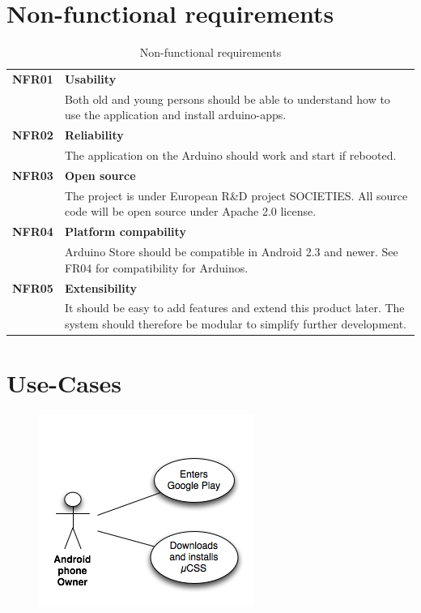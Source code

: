 \section{Non-functional requirements}
\begin{table}[H]
\begin{tabularx}{\linewidth}{lX}
\textbf{NFR01} & \textbf{Usability}\\
 & Both old and young persons should be able to understand how to use the application and install arduino-apps.\\
\textbf{NFR02} & \textbf{Reliability}\\
 & The application on the Arduino should work and start if rebooted.\\
\textbf{NFR03} & \textbf{Open source}\\
 & The project is under European R\&D project SOCIETIES. All source code will be open source under Apache 2.0 license.\\
\textbf{NFR04} & \textbf{Platform compability}\\
 & Arduino Store should be compatible in Android 2.3 and newer. See FR04 for compatibility for Arduinos.\\
\textbf{NFR05} & \textbf{Extensibility}\\
 & It should be easy to add features and extend this product later. The system should therefore be modular to simplify further development.\\
\end{tabularx}
\caption{Non-functional requirements}
\end{table}


\section{Use-Cases}
\begin{figure}[H]
\centering
\includegraphics[scale=0.7]{images/UseCase1}
\end{figure}

